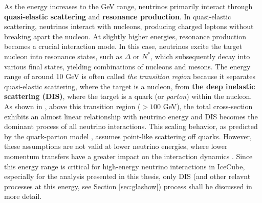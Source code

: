 As the energy increases to the GeV range, neutrinos primarily interact through \textbf{quasi-elastic scattering} and \textbf{resonance production}. In quasi-elastic scattering, neutrinos interact with nucleons, producing charged leptons without breaking apart the nucleon. At slightly higher energies, resonance production becomes a crucial interaction mode. In this case, neutrinos excite the target nucleon into resonance states, such as $\Delta$ or $N^*$, which subsequently decay into various final states, yielding combinations of nucleons and mesons. The energy range of around 10 GeV is often called \emph{the transition region} because it separates quasi-elastic scattering, where the target is a nucleon, from \textbf{ the deep inelastic scattering (DIS)}, where the target is a quark (or \emph{parton}) within the nucleon. As shown in , above this transition region ($> 100$ GeV), the total cross-section exhibits an almost linear relationship with neutrino energy and DIS becomes the dominant process of all neutrino interactions. This scaling behavior, as predicted by the quark-parton model , assumes point-like scattering off quarks. However, these assumptions are not valid at lower neutrino energies, where lower momentum transfers have a greater impact on the interaction dynamics . Since this energy range is critical for high-energy neutrino interactions in IceCube, especially for the analysis presented in this thesis, only DIS (and other relavnt processes at this energy, see Section \ref{sec:glashow}) process shall be discussed in more detail. 

